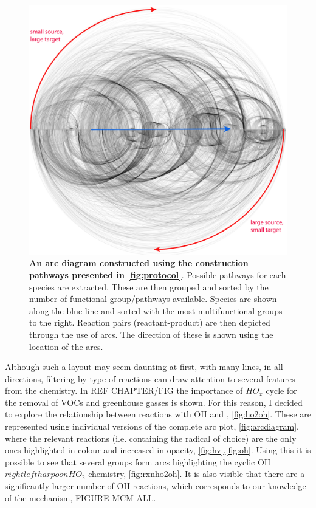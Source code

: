 \begin{figure}[H]
     \centering
     \includegraphics[width=.8\textwidth]{figures_c1/arc/arc_all.png}
     \caption{\textbf{An arc diagram constructed using the construction pathways presented in \autoref{fig:protocol}}. Possible pathways for each species are extracted. These are then grouped and sorted by the number of functional group/pathways available. Species are shown along the blue line and sorted with the most multifunctional groups to the right. Reaction pairs (reactant-product) are then depicted through the use of arcs. The direction of these is shown using the location of the arcs. }
     \label{fig:arcdiagram}
\end{figure}

Although such a layout may seem daunting at first, with many lines, in all directions, filtering by type of reactions can draw attention to several features from the chemistry. In REF CHAPTER/FIG the importance of $HO_x$ cycle for the removal of VOCs and greenhouse gasses is shown. For this reason, I decided to explore the relationship between reactions with OH and , \autoref{fig:ho2oh}. These are represented using individual versions of the complete arc plot, \autoref{fig:arcdiagram}, where the relevant reactions (i.e. containing the radical of choice) are the only ones highlighted in colour and increased in opacity, \autoref{fig:hv},\autoref{fig:oh}.  
Using this it is possible to see that several groups form arcs highlighting the cyclic OH $  rightleftharpoon HO_2 $ chemistry, 
\autoref{fig:rxnho2oh}. It is also visible that there are a significantly larger number of OH reactions, which corresponds to our knowledge of the mechanism, FIGURE MCM ALL. 

